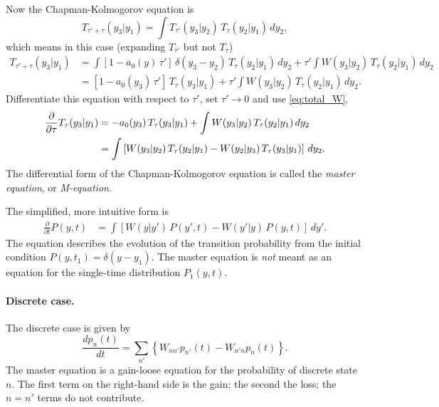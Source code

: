 \documentclass{book}
\numberwithin{equation}{section}
\theoremstyle{plain}
\theoremstyle{definition}
\theoremstyle{remark}
\theoremstyle{BoldStyle}
\numberwithin{exercise}{section}
\begin{document}
Now the Chapman-Kolmogorov equation is
\begin{equation}
  T_{\tau' + \tau}(y_3 | y_1)
  =
  \int T_{\tau'}(y_3 | y_2) \, T_\tau(y_2 | y_1) \, dy_2,
  \tag{IV.3.2}
  \label{eq:ChapmanKolmogorov}
\end{equation}
which means in this case (expanding $T_{\tau'}$ but not $T_\tau$)
{\footnotesize
$$
\begin{aligned}
  T_{\tau' + \tau}(y_3 | y_1)
  &=
  \int \left[1 - a_0(y) \, \tau'\right] \, \delta(y_3 - y_2) \, T_\tau(y_2 | y_1) \, dy_2
  +
  \tau' \int W(y_3|y_2) \, T_\tau(y_2 | y_1) \, dy_2
  \\
  &=
  \left[1 - a_0(y_3) \, \tau'\right] \, T_\tau(y_3 | y_1)
  +
  \tau' \int W(y_3 | y_2) \, T_\tau(y_2 | y_1) \, dy_2.
\end{aligned}
$$
}
Differentiate this equation with respect to $\tau'$,
set $\tau' \to 0$ and use \eqref{eq:total_W},
\begin{align}
\frac{ \partial } { \partial \tau } T_\tau(y_3 | y_1 )
&=
-a_0(y_3) \, T_\tau(y_3 | y_1)
+
\int W(y_3 | y_2) \, T_\tau(y_2 | y_1) \, dy_2
\notag \\
&=
\int
\left[
  W(y_3 | y_2) \, T_\tau(y_2 | y_1)
  -
  W(y_2 | y_3) \, T_\tau(y_3 | y_1)
\right] \, dy_2.
\label{eq:master_equation_T}
\end{align}
%
The differential form of the Chapman-Kolmogorov equation
is called the \emph{master equation},
or \emph{M-equation}.

The simplified, more intuitive form is
%
\begin{align}
  \frac{ \partial } { \partial t } P(y, t)
&=
\int
\left[
  W(y | y') \, P(y', t)
  -
  W(y' | y) \, P(y, t)
\right] \, dy'.
\label{eq:master_equation_continuous}
\end{align}
%
The equation describes the evolution of
the transition probability
from the initial condition $P(y, t_1) = \delta(y - y_1)$.
%
The master equation is \emph{not} meant as an equation
for the single-time distribution $P_1(y, t)$.

\paragraph{Discrete case.}

The discrete case is given by
%
\begin{equation}
\frac{ d p_n(t) } { dt }
=
\sum_{n'}
\left\{
  W_{n n'} p_{n'}(t)
  -
  W_{n' n} p_n(t)
\right\}.
\label{eq:master_equation_discrete}
\end{equation}
%
The master equation is a gain-loose equation
for the probability of discrete state $n$.
%
The first term on the right-hand side is the gain;
the second the loss;
the $n = n'$ terms do not contribute.
\end{document}
